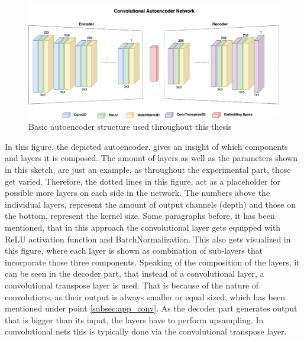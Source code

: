 \begin{figure}[htb!]
	\caption{Basic autoencoder structure used throughout this thesis}
	\label{fig:app_autoencoder}
	\centering
	\includegraphics[width=\textwidth]{images/approach/autoencoder.png}
\end{figure}

In this figure, the depicted autoencoder, gives an insight of which components and layers it is composed. The amount of layers as well as the parameters shown in this sketch, are just an example, as throughout the experimental part, those get varied. Therefore, the dotted lines in this figure, act as a placeholder for possible more layers on each side in the network. The numbers above the individual layers, represent the amount of output channels (depth) and those on the bottom, represent the kernel size. Some paragraphs before, it has been mentioned, that in this approach the convolutional layer gets equipped with ReLU activation function and BatchNormalization. This also gets visualized in this figure, where each layer is shown as combination of sub-layers that incorporate those three components. Speaking of the composition of the layers, it can be seen in the decoder part, that instead of a convolutional layer, a convolutional transpose layer is used. That is because of the nature of convolutions, as their output is always smaller or equal sized, which has been mentioned under point \ref{subsec:app_conv}. As the decoder part generates output that is bigger than its input, the layers have to perform upsampling. In convolutional nets this is typically done via the convolutional transpose layer.\\

